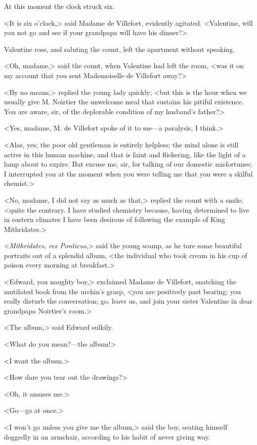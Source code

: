  At this moment the clock struck six. 

 <It is six o'clock,> said Madame de Villefort, evidently agitated. <Valentine, will you not go and see if your grandpapa will have his dinner?> 

 Valentine rose, and saluting the count, left the apartment without speaking. 

 <Oh, madame,> said the count, when Valentine had left the room, <was it on my account that you sent Mademoiselle de Villefort away?> 

 <By no means,> replied the young lady quickly; <but this is the hour when we usually give M. Noirtier the unwelcome meal that sustains his pitiful existence. You are aware, sir, of the deplorable condition of my husband's father?> 

 <Yes, madame, M. de Villefort spoke of it to me—a paralysis, I think.> 

 <Alas, yes; the poor old gentleman is entirely helpless; the mind alone is still active in this human machine, and that is faint and flickering, like the light of a lamp about to expire. But excuse me, sir, for talking of our domestic misfortunes; I interrupted you at the moment when you were telling me that you were a skilful chemist.> 

 <No, madame, I did not say as much as that,> replied the count with a smile; <quite the contrary. I have studied chemistry because, having determined to live in eastern climates I have been desirous of following the example of King Mithridates.> 

 <\textit{Mithridates, rex Ponticus},> said the young scamp, as he tore some beautiful portraits out of a splendid album, <the individual who took cream in his cup of poison every morning at breakfast.> 

 <Edward, you naughty boy,> exclaimed Madame de Villefort, snatching the mutilated book from the urchin's grasp, <you are positively past bearing; you really disturb the conversation; go, leave us, and join your sister Valentine in dear grandpapa Noirtier's room.> 

 <The album,> said Edward sulkily. 

 <What do you mean?—the album!> 

 <I want the album.> 

 <How dare you tear out the drawings?> 

 <Oh, it amuses me.> 

 <Go—go at once.> 

 <I won't go unless you give me the album,> said the boy, seating himself doggedly in an armchair, according to his habit of never giving way. 

